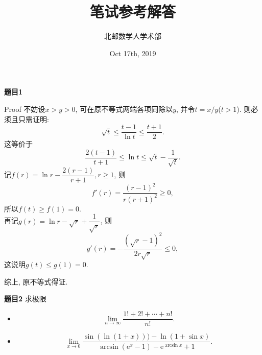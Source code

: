 \documentclass[aspectratio=43]{beamer}
\title{笔试参考解答} %
\author[北邮数学人学术部]{北邮数学人学术部}
\institute[BUPT]{
	Beijing University of Posts and Telecommunications%
} %
\date{Oct 17th, 2019}
\begin{document}
	
	\frame{\titlepage}
	
   \section{}
\begin{frame}{\textbf{题目1}}
\begin{block}[<+->]{Proof}
		不妨设$x>y>0$, 可在原不等式两端各项同除以$y$, 并令$t = x/y$($t>1$). 则必须且只需证明:
		\begin{equation*}
			\sqrt{t}\leqslant \frac{t-1}{\ln t}\leqslant\frac{t+1}{2}.
		\end{equation*}
		这等价于\begin{equation*}
			\frac{2(t-1)}{t+1}\leqslant \ln t\leqslant \sqrt{t}-\frac{1}{\sqrt{t}}.
		\end{equation*}
		记$f(r) = \ln r-\dfrac{2(r-1)}{r+1},r\geqslant 1$, 则
		\begin{equation*}
			f'(r) = \frac{(r-1)^2}{r(r+1)^2}\geqslant 0,
		\end{equation*}
		所以$f(t)\geqslant f(1) = 0$.\\
		再记$g(r) = \ln r - \sqrt{r}+\dfrac{1}{\sqrt{r}}$,
		则\begin{equation*}
		g'(r) = -\frac{(\sqrt{r}-1)^2}{2r\sqrt{r}}\leqslant 0,
		\end{equation*}
		这说明$g(t)\leqslant g(1) = 0$.
		
		综上, 原不等式得证.
	\end{block}
\end{frame}

\begin{frame}
	
\end{frame}

\begin{frame}{\textbf{题目2}}
求极限
\begin{itemize}
	\item
	\begin{equation*}
	\lim_{n\to\infty}\frac{1!+2!+\cdots+n!}{n!}.
	\end{equation*}
	\item
	\begin{equation*}
	\lim_{x\to 0}\frac{\sin(\ln(1+x)))-\ln(1+\sin x)}{\arcsin(\mathrm{e}^x-1)-\mathrm{e}^{\arcsin{x}}+1}.
	\end{equation*}

\end{itemize}

\end{frame}
\end{document}
